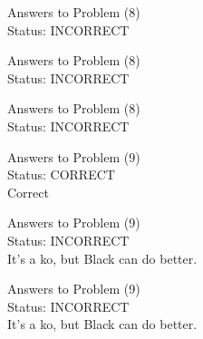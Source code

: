 \documentclass[11pt]{article}
\begin{document}
\begin{minipage}[t]{0.5\textwidth}
  {\centering
  
  Answers to Problem (8)\\
  Status: INCORRECT\\
  
  }
\end{minipage}
\begin{minipage}[t]{0.5\textwidth}
  {\centering
  
  Answers to Problem (8)\\
  Status: INCORRECT\\
  
  }
\end{minipage}
\begin{minipage}[t]{0.5\textwidth}
  {\centering
  
  Answers to Problem (8)\\
  Status: INCORRECT\\
  
  }
\end{minipage}
\begin{minipage}[t]{0.5\textwidth}
  {\centering
  
  Answers to Problem (9)\\
  Status: CORRECT\\
  Correct\\
  }
\end{minipage}
\begin{minipage}[t]{0.5\textwidth}
  {\centering
  
  Answers to Problem (9)\\
  Status: INCORRECT\\
  It's a ko, but Black can do better.\\
  }
\end{minipage}
\begin{minipage}[t]{0.5\textwidth}
  {\centering
  
  Answers to Problem (9)\\
  Status: INCORRECT\\
  It's a ko, but Black can do better.\\
  }
\end{minipage}
\end{document}
